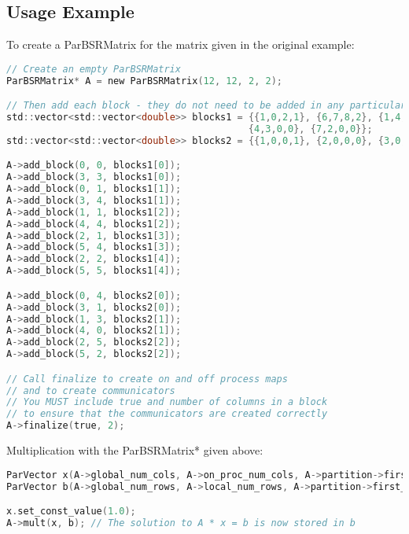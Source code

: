 \documentclass{article}
\begin{document}
\subsection*{Usage Example}

To create a ParBSRMatrix for the matrix given in the original example: 

\begin{lstlisting}[language=C,label=lst:bsr_mat1,caption=Creating a ParBSRMatrix]
// Create an empty ParBSRMatrix
ParBSRMatrix* A = new ParBSRMatrix(12, 12, 2, 2);

// Then add each block - they do not need to be added in any particular order
std::vector<std::vector<double>> blocks1 = {{1,0,2,1}, {6,7,8,2}, {1,4,5,1}, 
                                           {4,3,0,0}, {7,2,0,0}};
std::vector<std::vector<double>> blocks2 = {{1,0,0,1}, {2,0,0,0}, {3,0,1,0}};

A->add_block(0, 0, blocks1[0]);
A->add_block(3, 3, blocks1[0]);
A->add_block(0, 1, blocks1[1]);
A->add_block(3, 4, blocks1[1]);
A->add_block(1, 1, blocks1[2]);
A->add_block(4, 4, blocks1[2]);
A->add_block(2, 1, blocks1[3]);
A->add_block(5, 4, blocks1[3]);
A->add_block(2, 2, blocks1[4]);
A->add_block(5, 5, blocks1[4]);

A->add_block(0, 4, blocks2[0]);
A->add_block(3, 1, blocks2[0]);
A->add_block(1, 3, blocks2[1]);
A->add_block(4, 0, blocks2[1]);
A->add_block(2, 5, blocks2[2]);
A->add_block(5, 2, blocks2[2]);

// Call finalize to create on and off process maps
// and to create communicators
// You MUST include true and number of columns in a block
// to ensure that the communicators are created correctly
A->finalize(true, 2);

\end{lstlisting}

Multiplication with the ParBSRMatrix* given above:

\begin{lstlisting}[language=C,label=lst:bsr_mat1,caption=Creating a BSRMatrix]
ParVector x(A->global_num_cols, A->on_proc_num_cols, A->partition->first_local_col);
ParVector b(A->global_num_rows, A->local_num_rows, A->partition->first_local_row);

x.set_const_value(1.0);
A->mult(x, b); // The solution to A * x = b is now stored in b

\end{lstlisting}
\end{document}
